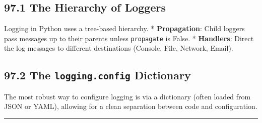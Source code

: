 \hypertarget{the-hierarchy-of-loggers}{%
\subsection{97.1 The Hierarchy of
Loggers}\label{the-hierarchy-of-loggers}}

Logging in Python uses a tree-based hierarchy. * \textbf{Propagation}:
Child loggers pass messages up to their parents unless
\passthrough{\lstinline!propagate!} is False. * \textbf{Handlers}:
Direct the log messages to different destinations (Console, File,
Network, Email).

\hypertarget{the-logging.config-dictionary}{%
\subsection{\texorpdfstring{97.2 The \texttt{logging.config}
Dictionary}{97.2 The logging.config Dictionary}}\label{the-logging.config-dictionary}}

The most robust way to configure logging is via a dictionary (often
loaded from JSON or YAML), allowing for a clean separation between code
and configuration.

\begin{center}\rule{0.5\linewidth}{0.5pt}\end{center}
